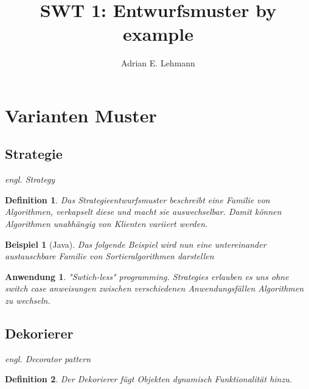\documentclass[a4paper]{article}
\title{SWT 1: Entwurfsmuster by example}
\author{Adrian E. Lehmann}
\theoremstyle{break}
\newtheorem{defi}{Definition}[section]
\newtheorem{ex}{Beispiel}[section]
\newtheorem{why}{Anwendung}[section]
\begin{document}
\maketitle
\tableofcontents
\newpage

\section{Varianten Muster}

\subsection{Strategie}

\textit{engl. Strategy}

\begin{defi}
	Das Strategieentwurfsmuster beschreibt eine Familie von Algorithmen, verkapselt diese und macht sie auswechselbar. Damit können Algorithmen unabhängig von Klienten variiert werden.
\end{defi}

\begin{ex}[Java]
	Das folgende Beispiel wird nun eine untereinander austauschbare Familie von Sortieralgorithmen darstellen


	
	
	
	
		
\end{ex}

\begin{why}
	"Swtich-less" programming. Strategies erlauben es uns ohne switch case anweisungen zwischen verschiedenen Anwendungsfällen Algorithmen zu wechseln.
\end{why}

\newpage
\subsection{Dekorierer}

\textit{engl. Decorator pattern}

\begin{defi}
	Der Dekorierer fügt Objekten dynamisch Funktionalität hinzu.
\end{defi}
\end{document}
